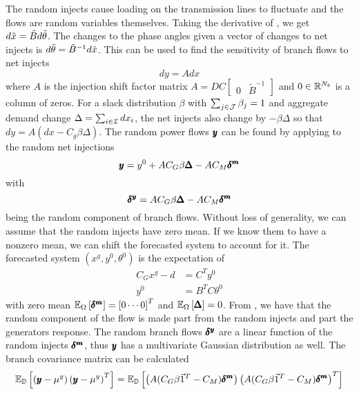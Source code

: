 The random injects cause loading on the transmission lines to fluctuate and the flows are random variables themselves. Taking the derivative of , we get $d \tilde{x} = \tilde{B} d \tilde{\theta} $.  The changes to the phase angles given a vector of changes to net injects is $ d \tilde{\theta} = \tilde{B}^{-1} d \tilde{x} $.  This can be used to find the sensitivity of branch flows to net injects 
\begin{equation}\label{isf}
 d y = A d x 
\end{equation}
where $A$ is the injection shift factor matrix $A = D C \left[\begin{array}{cc} 0 & \tilde{B}^{-1} \end{array} \right]$ and $0\in \mathbb{R}^{N_b}$ is a column of zeros.  For a slack distribution $\beta$ with $\sum_{j \in \mathcal{J}} \beta_j=1$ and aggregate demand change $\Delta = \sum_{i \in \mathcal{I}} dx_i$, the net injects also change by $- \beta \Delta$ so that $dy = A\left( dx - C_g \beta \Delta \right)$.  The random power flows $\pmb{y}$ can be found by applying  to the random net injections 
\begin{equation}\label{rand_flow}
 \pmb{y} = y^0+ A C_G \beta \pmb{\Delta}  - A C_M \pmb{\delta^m} 
\end{equation}
with 
\begin{equation}
\pmb{\delta^y} = A C_G \beta \pmb{\Delta} - AC_M \pmb{\delta^m}
\end{equation}
being the random component of branch flows.
Without loss of generality, we can assume that the random injects have zero mean.  If we know them to have a nonzero mean, we can shift the forecasted system to account for it. 
The forecasted system  $\left(x^g, y^0, \theta^0\right)$ is the expectation of 
\begin{align*}
C_G x^g - d &= C^T y^0 \\
y^0 &= B^T C \theta^0 
\end{align*}
with zero mean $\mathbb{E}_{\Omega} \left[ \pmb{\delta^m} \right]=\left[0 \cdots 0\right]^T$ and $\mathbb{E}_{\Omega} \left[ \pmb{\Delta} \right]=0$. 
From , we have that the random component of the flow is made part from the random injects and part the generators response.   The random branch flows $\pmb{\delta^y}$ are a linear function of the random injects $\pmb{\delta^m}$, thus $\pmb{y}$ has a multivariate Gaussian distribution as well.  The branch covariance matrix can be calculated
\begin{equation*}
\mathbb{E}_{\mathbb{D}} \left[  \left( \pmb{y} - \mu^y \right) \left( \pmb{y} - \mu^y \right)^T  \right] = \mathbb{E}_{\mathbb{D}} \left[ \left( A(C_G\beta \vec{1}^T - C_M) \pmb{\delta^m} \right) \left( A(C_G\beta \vec{1}^T - C_M )\pmb{\delta^m} \right)^T  \right] 
\end{equation*}
